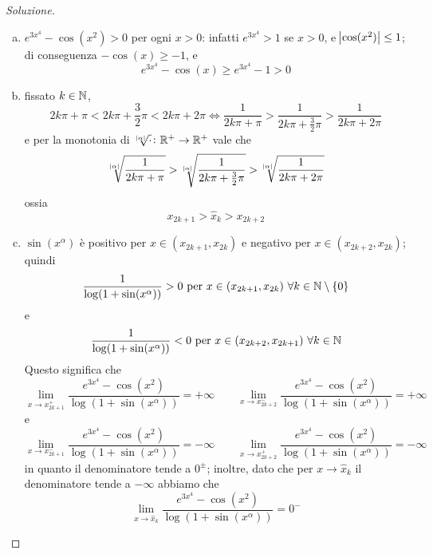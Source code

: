 \begin{proof}[Soluzione]
\begin{enumerate}[(i)]
        \begin{enumerate}[(a)]
            \item $e^{3x^4}-\cos(x^2)>0$ per ogni $x>0$: infatti $e^{3x^4}>1$ se $x>0$, e $\abs{\cos(x^2)}\le 1$; di conseguenza $-\cos(x)\ge -1$, e 
            \[
            e^{3x^4}-\cos(x)\ge e^{3x^4}-1 >0
            \]
            \item fissato $k\in\amsbb{N}$,
            \[
            2k\pi + \pi  < 2k\pi + \frac{3}{2}\pi < 2k\pi + 2\pi \iff \frac{1}{2k\pi + \pi}> \frac{1}{2k\pi + \frac{3}{2}\pi}>\frac{1}{2k\pi + 2\pi}
            \]
            e per la monotonia di $\sqrt[\abs{\alpha}]{\cdot}\colon \amsbb{R}^+\to\amsbb{R}^+$ vale che
            \[
            \sqrt[\abs{\alpha}]{\frac{1}{2k\pi + \pi}}> \sqrt[\abs{\alpha}]{\frac{1}{2k\pi + \frac{3}{2}\pi}}>\sqrt[\abs{\alpha}]{\frac{1}{2k\pi + 2\pi}}
            \]
            ossia
            \[
            x_{2k+1}>\hat{x}_{k}>x_{2k+2}
            \]
            \item $\sin(x^\alpha)$ è positivo per $x\in (x_{2k+1}, x_{2k})$ e negativo per $x\in (x_{2k+2}, x_{2k})$; quindi
            \[
            \frac{1}{\log(1+\sin(x^\alpha))}>0 \ \text{per} \ x\in(x_{2k+1}, x_{2k}) \  \forall k\in\amsbb{N}\setminus\{0\}
            \]
            e
            \[
            \frac{1}{\log(1+\sin(x^\alpha))}<0 \ \text{per} \ x\in(x_{2k+2}, x_{2k+1}) \  \forall k\in\amsbb{N}
            \]
            Questo significa che
            \[
            \lim_{x\to x_{2k+1}^+} \frac{e^{3x^4}-\cos(x^2)}{\log(1+\sin(x^\alpha))} = +\infty \qquad \lim_{x\to x_{2k+2}^-} \frac{e^{3x^4}-\cos(x^2)}{\log(1+\sin(x^\alpha))} = +\infty
            \]
            e 
            \[
            \lim_{x\to x_{2k+1}^-} \frac{e^{3x^4}-\cos(x^2)}{\log(1+\sin(x^\alpha))} = -\infty \qquad \lim_{x\to x_{2k+2}^+} \frac{e^{3x^4}-\cos(x^2)}{\log(1+\sin(x^\alpha))} = -\infty
            \]
            in quanto il denominatore tende a $0^\pm$; inoltre, dato che per $x\to \hat{x}_k$ il denominatore tende a $-\infty$ abbiamo che
            \[
            \lim_{x\to \hat{x}_k} \frac{e^{3x^4}-\cos(x^2)}{\log(1+\sin(x^\alpha))} = 0^-
            \]
        \end{enumerate}
        \begin{center}
\end{center}
\end{enumerate}
\end{proof}
